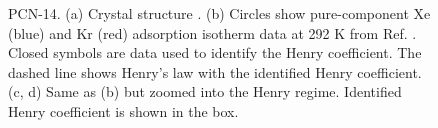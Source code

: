     \begin{figure}[h!]
       \centering
  
       
       \caption{PCN-14. (a) Crystal structure \cite{PCN-14_structure}.
       (b) Circles show pure-component Xe (blue) and Kr (red) adsorption isotherm data at 292 K from Ref. \cite{PCN-14_XeKr}. 
       Closed symbols are data used to identify the Henry coefficient. The dashed line shows Henry's law with the identified Henry coefficient.
       (c, d) Same as (b) but zoomed into the Henry regime. Identified Henry coefficient is shown in the box.}
    \end{figure}
    
    \clearpage
    
    